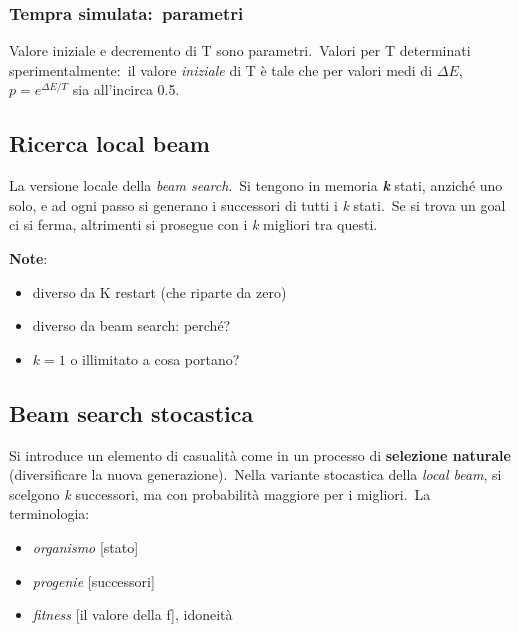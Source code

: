 \subsubsection{Tempra simulata:\ parametri}
Valore iniziale e decremento di T sono
parametri.\
Valori per T determinati sperimentalmente:\ il
valore \textit{iniziale} di T è tale che per valori medi di $\Delta E$, $p=e^{\Delta E/T}$ sia all'incirca 0.5.\

\subsection{Ricerca local beam}

La versione locale della \textit{beam search}.\
Si tengono in memoria \textbf{\textit{k}} stati, anziché uno solo, e ad ogni passo si generano i successori di tutti i \textit{k} stati.\
Se si trova un goal ci si ferma, altrimenti si prosegue con i \textit{k} migliori tra questi.\

\noindent \textbf{Note}:
\begin{itemize}
	\item diverso da K restart (che riparte da zero)
	\item diverso da beam search: perché?
	\item $k=1$ o illimitato a cosa portano?
\end{itemize}

\subsection{Beam search stocastica}

Si introduce un elemento di casualità come in un processo di \textbf{selezione naturale} (diversificare la nuova generazione).\
Nella variante stocastica della \textit{local beam}, si scelgono \textit{k} successori, ma con probabilità maggiore per i migliori.\
La terminologia:
\begin{itemize}
	\item \textit{organismo} [stato]
	\item \textit{progenie} [successori]
	\item \textit{fitness} [il valore della f], idoneità
\end{itemize}

